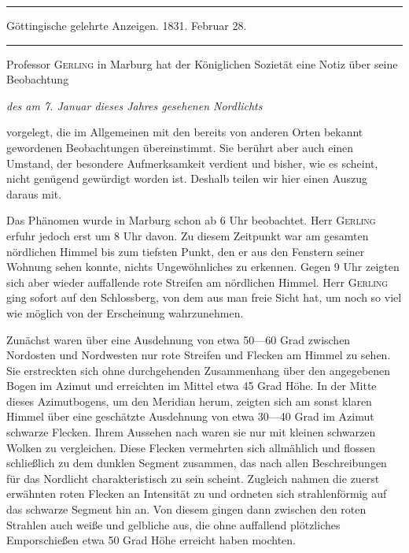 \begin{center}
\hrule\vspace{2mm}
Göttingische gelehrte Anzeigen. 1831. Februar 28.
\vspace{2mm}\hrule\vspace{5mm}
\end{center}
Professor \textsc{Gerling} in Marburg hat der Königlichen Sozietät eine Notiz über seine Beobachtung
\begin{center}\itshape des am 7. Januar dieses Jahres gesehenen Nordlichts\end{center}
\noindent vorgelegt, die im Allgemeinen mit den bereits von anderen Orten bekannt gewordenen Beobachtungen übereinstimmt. Sie berührt aber auch einen Umstand, der besondere Aufmerksamkeit verdient und bisher, wie es scheint, nicht genügend gewürdigt worden ist. Deshalb teilen wir hier einen Auszug daraus mit.

Das Phänomen wurde in Marburg schon ab 6 Uhr beobachtet. Herr \textsc{Gerling} erfuhr jedoch erst um 8 Uhr davon. Zu diesem Zeitpunkt war am gesamten nördlichen Himmel bis zum tiefsten Punkt, den er aus den Fenstern seiner Wohnung sehen konnte, nichts Ungewöhnliches zu erkennen. Gegen 9 Uhr zeigten sich aber wieder auffallende rote Streifen am nördlichen Himmel. Herr \textsc{Gerling} ging sofort auf den Schlossberg, von dem aus man freie Sicht hat, um noch so viel wie möglich von der Erscheinung wahrzunehmen.

Zunächst waren über eine Ausdehnung von etwa 50—60 Grad zwischen Nordosten und Nordwesten nur rote Streifen und Flecken am Himmel zu sehen. Sie erstreckten sich ohne durchgehenden Zusammenhang über den angegebenen Bogen im Azimut und erreichten im Mittel etwa 45 Grad Höhe. In der Mitte dieses Azimutbogens, um den Meridian herum, zeigten sich am sonst klaren Himmel über eine geschätzte Ausdehnung von etwa 30—40 Grad im Azimut schwarze Flecken. Ihrem Aussehen nach waren sie nur mit kleinen schwarzen Wolken zu vergleichen. Diese Flecken vermehrten sich allmählich und flossen schließlich zu dem dunklen Segment zusammen, das nach allen Beschreibungen für das Nordlicht charakteristisch zu sein scheint. Zugleich nahmen die zuerst erwähnten roten Flecken an Intensität zu und ordneten sich strahlenförmig auf das schwarze Segment hin an. Von diesem gingen dann zwischen den roten Strahlen auch weiße und gelbliche aus, die ohne auffallend plötzliches Emporschießen etwa 50 Grad Höhe erreicht haben mochten.


